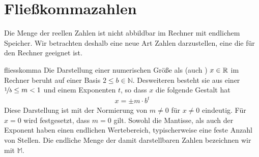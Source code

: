\section{Fließkommazahlen}

\begin{intro}
  Die Menge der reellen Zahlen ist nicht abbildbar im Rechner mit endlichem Speicher.
  Wir betrachten deshalb eine neue Art Zahlen darzustellen, eine die für den Rechner geeignet ist.
\end{intro}

\begin{Definition}{fliesskomma}
  Die Darstellung einer numerischen Größe als 
  (auch ) $x \in \mathbb R$ im Rechner beruht auf einer
  Basis $2 \le b \in \mathbb N$. Desweiteren besteht sie aus einer 
  $\nicefrac1b \le m < 1$ und einem Exponenten $t$, so dass $x$ die folgende Gestalt hat
  \begin{gather}
    x=\pm m \cdot b^{t}
  \end{gather}
  Diese Darstellung ist mit der Normierung von $m\neq 0$ für $x\neq 0$
  eindeutig. Für $x=0$ wird festgesetzt, dass $m=0$ gilt.
  Sowohl die Mantisse, als auch der Exponent haben einen
  endlichen Wertebereich, typischerweise eine feste Anzahl von
  Stellen. Die endliche Menge der damit darstellbaren Zahlen
  bezeichnen wir mit $\mathbb M$.
\end{Definition}

